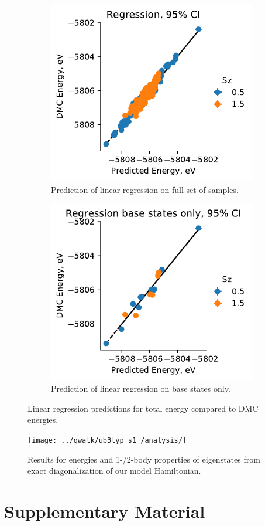 \documentclass{article}
\begin{document}
\begin{figure}
\centering
\begin{subfigure}{.5\textwidth}
  \centering
  \includegraphics[width=\linewidth]{../qwalk/ub3lyp_s1_/analysis/fit_0_sel2_log.pdf}
  \caption{Prediction of linear regression on full set of samples.}
  \label{fig:Regression1}
\end{subfigure}%
\begin{subfigure}{.5\textwidth}
  \centering
  \includegraphics[width=\linewidth]{../qwalk/ub3lyp_s1_/analysis/fit_0_sel2_log_base.pdf}
  \caption{Prediction of linear regression on base states only.}
  \label{fig:Regression2}
\end{subfigure}
\label{fig:Regression}
\caption{Linear regression predictions for total energy compared to DMC energies.}
\end{figure}

\begin{figure}
\centering
\texttt{[image: ../qwalk/ub3lyp\_s1\_/analysis/]}
\label{fig:Regression}
\caption{Results for energies and 1-/2-body properties of eigenstates from exact diagonalization of our model Hamiltonian.}
\end{figure}

\section{Supplementary Material} 
\end{document}
